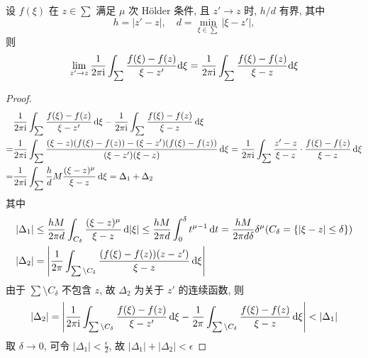 \begin{lemma}
  设  $ f(\xi) $ 在 $ z \in \sum$ 满足 $ \mu $ 次 H\"older 条件, 且 $ z' \to z$ 时, $ h/d $ 有界, 其中 
  \begin{equation}
    h = | z' - z|, \quad d = \min_{\xi \in \sum} |\xi - z' | ,
  \end{equation} 则 
  \begin{equation}
      \lim_{z' \to z} \frac{1}{2 \pi \mathrm{i}} \int_{\sum} \frac{f(\xi) - f(z)}{\xi - z'} \mathrm{d} \xi = \frac{1}{2 \pi \mathrm{i}} \int_{\sum} \frac{f(\xi) - f(z)}{\xi - z} \mathrm{d} \xi 
  \end{equation}
\end{lemma}
\begin{proof}
  \begin{equation}
    \begin{aligned}
      &\frac{1}{2 \pi \mathrm{i}} \int_{\sum} \frac{f(\xi) - f(z)}{\xi - z'} \,\mathrm{d} \xi - \frac{1}{2 \pi \mathrm{i}} \int_{\sum} \frac{f(\xi) - f(z)}{\xi - z} \,\mathrm{d} \xi \\
      =& \frac{1}{2\pi \mathrm{i}} \int_{\sum} \frac{(\xi - z)(f(\xi) - f(z)) -(\xi - z')(f(\xi) - f(z)) }{(\xi - z')(\xi - z)} \,\mathrm{d} \xi = \frac{1}{2\pi \mathrm{i}} \int_{\sum} \frac{z' - z}{\xi - z} \cdot \frac{f(\xi) - f(z)}{\xi - z} \,\mathrm{d} \xi \\
      =& \frac{1}{2\pi \mathrm{i}} \int_{\sum} \frac{h}{d} M \frac{(\xi - z)^{\mu}}{\xi - z} \, \mathrm{d} \xi = \Delta_{1} + \Delta_{2} 
    \end{aligned}
  \end{equation}
  其中
  \begin{equation}
    \begin{aligned}
      | \Delta_{1} | &\leq \frac{hM}{2 \pi d} \int_{C_{\delta}} \frac{(\xi - z)^{\mu}}{\xi - z} \, \mathrm{d} | \xi | \leq \frac{hM}{2 \pi d} \int_{0}^{\delta} t^{\mu - 1} \, \mathrm{d} t = \frac{hM}{2 \pi d \delta} \delta^{\mu} (C_{\delta} = \{ | \xi - z | \leq \delta \} ) \\
      | \Delta_{2} | & =  \left| \frac{1}{2\pi} \int_{\sum \setminus  C_{\delta}} \frac{(f(\xi) - f(z))(z-z')}{\xi - z} \, \mathrm{d} \xi \right|
    \end{aligned}
  \end{equation}
  由于 $ \sum \setminus  C_{\delta} $ 不包含 $ z $, 故 $ \Delta_2 $ 为关于 $ z' $ 的连续函数, 则
  \begin{equation}
    | \Delta_{2} | =  \left| \frac{1}{2\pi \mathrm{i}} \int_{\sum \setminus  C_{\delta}} \frac{f(\xi) - f(z)}{\xi - z'} \, \mathrm{d} \xi - \frac{1}{2\pi} \int_{\sum \setminus  C_{\delta}} \frac{f(\xi) - f(z)}{\xi - z} \, \mathrm{d} \xi \right| < | \Delta_1 |
  \end{equation}
  取 $ \delta \to 0 $, 可令 $ | \Delta_1 | < \frac{\epsilon}{2} $, 故 $ | \Delta_1 | + | \Delta_2 | < \epsilon $
\end{proof}

